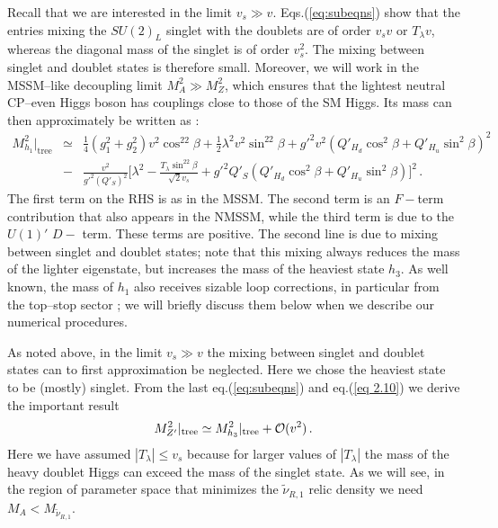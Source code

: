 \documentclass[a4paper,11pt]{article}
\begin{document}
Recall that we are interested in the limit $v_s \gg v$.
Eqs.(\ref{eq:subeqns}) show that the entries mixing the $SU(2)_L$
singlet with the doublets are of order $v_s v$ or $T_\lambda v$,
whereas the diagonal mass of the singlet is of order $v_s^2$. The
mixing between singlet and doublet states is therefore
small. Moreover, we will work in the MSSM--like decoupling limit
$M_A^2 \gg M_Z^2$, which ensures that the lightest neutral CP--even
Higgs boson has couplings close to those of the SM Higgs. Its mass can
then approximately be written as \cite{King:2005jy, Belanger:2017vpq}:
%
\begin{eqnarray}  \label{eq 1.65}
M_{h_1}^2|_{\text{tree}} &\simeq& \frac{1}{4} ( g_1^2 + g_2^2 ) v^2 \cos^22\beta
+ \frac{1}{2} \lambda^2 v^2 \sin^22\beta + g'^2 v^2 
\left(Q'_{H_d} \cos^2\beta + Q'_{H_u} \sin^2\beta \right)^2 \nonumber \\
& - & \frac{v^2} { g'^2 (Q'_S)^2} \Big[ \lambda^2 - \frac {T_\lambda \sin^22\beta}
{\sqrt 2 v_s} + g'^2 Q'_S \left( Q'_{H_d} \cos^2\beta + Q'_{H_u} \sin^2\beta
\right) \Big]^2\,.
\end{eqnarray}
%
The first term on the RHS is as in the MSSM. The second term is an
$F-$term contribution that also appears in the NMSSM, while the third
term is due to the $U(1)'$ $D-$ term. These terms are positive. The
second line is due to mixing between singlet and doublet states; note
that this mixing always reduces the mass of the lighter eigenstate,
but increases the mass of the heaviest state $h_3$. As well known, the
mass of $h_1$ also receives sizable loop corrections, in particular
from the top--stop sector \cite{Okada:1990vk, Haber:1990aw}; we will
briefly discuss them below when we describe our numerical procedures.

As noted above, in the limit $v_s \gg v$ the mixing between singlet and
doublet states can to first approximation be neglected. Here we chose
the heaviest state to be (mostly) singlet. From the last eq.(\ref{eq:subeqns})
and eq.(\ref{eq 2.10}) we derive the important result
%
\begin{equation} \label{ms}
M^2_{Z'}|_{\text{tree}} \simeq M_{h_3}^2|_{\text{tree}} + {\cal O}(v^2)\,.
\end{equation}
%
Here we have assumed $|T_\lambda| \leq v_s$ because for larger values
of $|T_\lambda|$ the mass of the heavy doublet Higgs can exceed the
mass of the singlet state. As we will see, in the region of parameter
space that minimizes the $\tilde \nu_{R,1}$ relic density we need
$M_A < M_{\tilde \nu_{R,1}}$.
\end{document}
